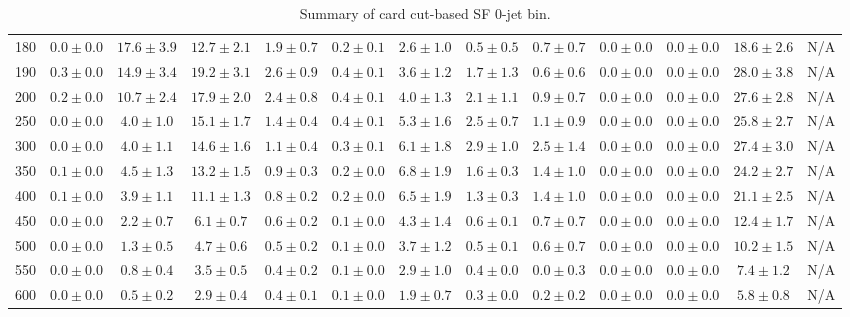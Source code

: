 \begin{table}
{\begin{center}
\begin{tabular}{l | c c | c c c c c c c c  | c c}
180 & $0.0\pm0.0$ & $17.6\pm3.9$ & $12.7\pm2.1$ & $1.9\pm0.7$ & $0.2\pm0.1$ & $2.6\pm1.0$ & $0.5\pm0.5$ & $0.7\pm0.7$ & $0.0\pm0.0$ & $0.0\pm0.0$ & $18.6\pm2.6$ & N/A \\
190 & $0.3\pm0.0$ & $14.9\pm3.4$ & $19.2\pm3.1$ & $2.6\pm0.9$ & $0.4\pm0.1$ & $3.6\pm1.2$ & $1.7\pm1.3$ & $0.6\pm0.6$ & $0.0\pm0.0$ & $0.0\pm0.0$ & $28.0\pm3.8$ & N/A \\
200 & $0.2\pm0.0$ & $10.7\pm2.4$ & $17.9\pm2.0$ & $2.4\pm0.8$ & $0.4\pm0.1$ & $4.0\pm1.3$ & $2.1\pm1.1$ & $0.9\pm0.7$ & $0.0\pm0.0$ & $0.0\pm0.0$ & $27.6\pm2.8$ & N/A \\
250 & $0.0\pm0.0$ & $4.0\pm1.0$ & $15.1\pm1.7$ & $1.4\pm0.4$ & $0.4\pm0.1$ & $5.3\pm1.6$ & $2.5\pm0.7$ & $1.1\pm0.9$ & $0.0\pm0.0$ & $0.0\pm0.0$ & $25.8\pm2.7$ & N/A \\
300 & $0.0\pm0.0$ & $4.0\pm1.1$ & $14.6\pm1.6$ & $1.1\pm0.4$ & $0.3\pm0.1$ & $6.1\pm1.8$ & $2.9\pm1.0$ & $2.5\pm1.4$ & $0.0\pm0.0$ & $0.0\pm0.0$ & $27.4\pm3.0$ & N/A \\
350 & $0.1\pm0.0$ & $4.5\pm1.3$ & $13.2\pm1.5$ & $0.9\pm0.3$ & $0.2\pm0.0$ & $6.8\pm1.9$ & $1.6\pm0.3$ & $1.4\pm1.0$ & $0.0\pm0.0$ & $0.0\pm0.0$ & $24.2\pm2.7$ & N/A \\
400 & $0.1\pm0.0$ & $3.9\pm1.1$ & $11.1\pm1.3$ & $0.8\pm0.2$ & $0.2\pm0.0$ & $6.5\pm1.9$ & $1.3\pm0.3$ & $1.4\pm1.0$ & $0.0\pm0.0$ & $0.0\pm0.0$ & $21.1\pm2.5$ & N/A \\
450 & $0.0\pm0.0$ & $2.2\pm0.7$ & $6.1\pm0.7$ & $0.6\pm0.2$ & $0.1\pm0.0$ & $4.3\pm1.4$ & $0.6\pm0.1$ & $0.7\pm0.7$ & $0.0\pm0.0$ & $0.0\pm0.0$ & $12.4\pm1.7$ & N/A \\
500 & $0.0\pm0.0$ & $1.3\pm0.5$ & $4.7\pm0.6$ & $0.5\pm0.2$ & $0.1\pm0.0$ & $3.7\pm1.2$ & $0.5\pm0.1$ & $0.6\pm0.7$ & $0.0\pm0.0$ & $0.0\pm0.0$ & $10.2\pm1.5$ & N/A \\
550 & $0.0\pm0.0$ & $0.8\pm0.4$ & $3.5\pm0.5$ & $0.4\pm0.2$ & $0.1\pm0.0$ & $2.9\pm1.0$ & $0.4\pm0.0$ & $0.0\pm0.3$ & $0.0\pm0.0$ & $0.0\pm0.0$ & $7.4\pm1.2$ & N/A \\
600 & $0.0\pm0.0$ & $0.5\pm0.2$ & $2.9\pm0.4$ & $0.4\pm0.1$ & $0.1\pm0.0$ & $1.9\pm0.7$ & $0.3\pm0.0$ & $0.2\pm0.2$ & $0.0\pm0.0$ & $0.0\pm0.0$ & $5.8\pm0.8$ & N/A \\
\hline
\end{tabular}
\end{center}
}
\caption{Summary of card cut-based SF 0-jet bin.}
\end{table}
